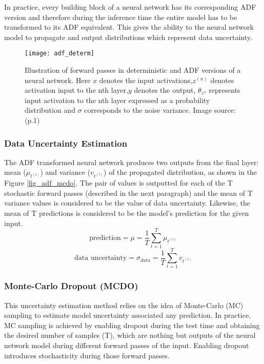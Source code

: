 	In practice, every building block of a neural network has its corresponding ADF version and therefore during the inference time the entire model has to be transformed to its ADF equivalent. This gives the ability to the neural network model to propagate and output distributions which represent data uncertainty.
	\begin{figure}[h]
		\centering
		\texttt{[image: adf\_determ]}
		\caption[Illustration of forward passes in deterministic and ADF versions of a neural network]{Illustration of forward passes in deterministic and ADF versions of a neural network. Here $x$ denotes the input activations,$z^{(n)}$ denotes activation input to the nth layer,$y$ denotes the output, $\theta_{z^n}$ represents input activation to the nth layer expressed as a probability distribution and $\sigma$ corresponds to the noise variance. Image source: \cite{loquercio2020a}(p.1) }
	\end{figure}
	
	\subsubsection{Data Uncertainty Estimation}
	The ADF transformed neural network produces two outputs from the final layer: mean ($\mu_{t^{(l)}}$) and variance ($v_{t^{(l)}}$) of the propagated distribution, as shown in the Figure \ref{fig_adf_mcdo}. The pair of values is outputted for each of the T stochastic forward passes (described in the next paragraph) and the mean of T variance values is considered to be the value of data uncertainty. Likewise, the mean of T predictions is considered to be the model's prediction for the given input.
	\begin{equation}
		\text{prediction} = \mu = \frac{1}{T}\sum_{t=1}^{T}\mu_{t^{(l)}}
	\end{equation}	 
	\begin{equation}
		\text{data uncertainty} = \sigma_{data}=\frac{1}{T}\sum_{t=1}^{T}v_{t^{(l)}}
	\end{equation}
	
	\subsubsection{Monte-Carlo Dropout (MCDO)}
	
	This uncertainty estimation method relies on the idea of Monte-Carlo (MC) sampling to estimate model uncertainty associated any prediction. In practice, MC sampling is achieved by enabling dropout during the test time and obtaining the desired number of samples (T), which are nothing but outputs of the neural network model during different forward passes of the input. Enabling dropout introduces stochasticity during those forward passes.
	
